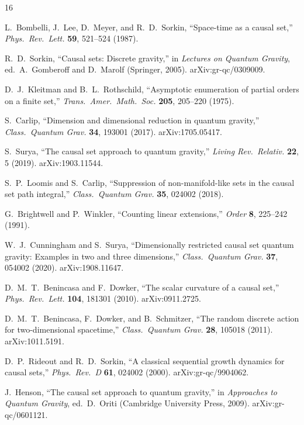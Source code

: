 \documentclass[12pt,a4paper]{article}
\begin{document}
\begin{thebibliography}{16}

L.~Bombelli, J.~Lee, D.~Meyer, and R.~D.~Sorkin,
``Space-time as a causal set,''
\textit{Phys.\ Rev.\ Lett.} \textbf{59}, 521--524 (1987).

R.~D.~Sorkin,
``Causal sets: Discrete gravity,''
in \textit{Lectures on Quantum Gravity}, ed.\ A.~Gomberoff and D.~Marolf
(Springer, 2005). arXiv:gr-qc/0309009.

D.~J.~Kleitman and B.~L.~Rothschild,
``Asymptotic enumeration of partial orders on a finite set,''
\textit{Trans.\ Amer.\ Math.\ Soc.} \textbf{205}, 205--220 (1975).

S.~Carlip,
``Dimension and dimensional reduction in quantum gravity,''
\textit{Class.\ Quantum Grav.} \textbf{34}, 193001 (2017).
arXiv:1705.05417.

S.~Surya,
``The causal set approach to quantum gravity,''
\textit{Living Rev.\ Relativ.} \textbf{22}, 5 (2019).
arXiv:1903.11544.

S.~P.~Loomis and S.~Carlip,
``Suppression of non-manifold-like sets in the causal set path integral,''
\textit{Class.\ Quantum Grav.} \textbf{35}, 024002 (2018).

G.~Brightwell and P.~Winkler,
``Counting linear extensions,''
\textit{Order} \textbf{8}, 225--242 (1991).

W.~J.~Cunningham and S.~Surya,
``Dimensionally restricted causal set quantum gravity: Examples in two and
three dimensions,''
\textit{Class.\ Quantum Grav.} \textbf{37}, 054002 (2020).
arXiv:1908.11647.

D.~M.~T.~Benincasa and F.~Dowker,
``The scalar curvature of a causal set,''
\textit{Phys.\ Rev.\ Lett.} \textbf{104}, 181301 (2010).
arXiv:0911.2725.

D.~M.~T.~Benincasa, F.~Dowker, and B.~Schmitzer,
``The random discrete action for two-dimensional spacetime,''
\textit{Class.\ Quantum Grav.} \textbf{28}, 105018 (2011).
arXiv:1011.5191.

D.~P.~Rideout and R.~D.~Sorkin,
``A classical sequential growth dynamics for causal sets,''
\textit{Phys.\ Rev.\ D} \textbf{61}, 024002 (2000).
arXiv:gr-qc/9904062.

J.~Henson,
``The causal set approach to quantum gravity,''
in \textit{Approaches to Quantum Gravity}, ed.\ D.~Oriti
(Cambridge University Press, 2009). arXiv:gr-qc/0601121.


\end{thebibliography}
\end{document}
